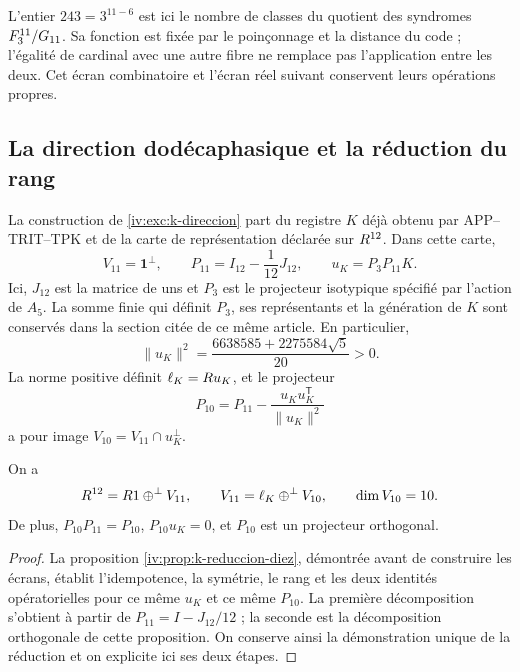 L’entier \(243=3^{11-6}\) est ici le nombre de classes
du quotient des syndromes \(F_3^{11}/G_{11}\). Sa
fonction est fixée par le poinçonnage et la distance du
code ; l’égalité de cardinal avec une autre fibre ne remplace pas
l’application entre les deux. Cet écran combinatoire et
l’écran réel suivant conservent leurs opérations propres.

\subsection{La direction dodécaphasique et la réduction du rang}

La construction de \ref{iv:exc:k-direccion} part du registre
\(K\) déjà obtenu par APP--TRIT--TPK et de la carte de
représentation déclarée sur \(R^{12}\). Dans cette carte,
\begin{equation}
 V_{11}=\mathbf1^\perp,\qquad
 P_{11}=I_{12}-\frac1{12}J_{12},\qquad
 u_K=P_3P_{11}K.
 \label{iv:iv:eq:p11-uk}
\end{equation}
Ici, \(J_{12}\) est la matrice de uns et \(P_3\) est le
projecteur isotypique spécifié par l’action de \(A_5\).
La somme finie qui définit \(P_3\), ses représentants et la
génération de \(K\) sont conservés dans la section citée de
ce même article. En particulier,
\[
 \|u_K\|^2=\frac{6638585+2275584\sqrt5}{20}>0.
\]
La norme positive définit \(\ell_K=R u_K\), et le
projecteur
\begin{equation}
 P_{10}=P_{11}-\frac{u_Ku_K^{\mathsf T}}{\|u_K\|^2}
 \label{iv:iv:eq:p10}
\end{equation}
a pour image \(V_{10}=V_{11}\cap u_K^\perp\).

\begin{proposition}
\label{iv:iv:prop:12-11-10}
On a
\[
 R^{12}=R1\mathbin{\oplus^\perp}V_{11},\qquad
 V_{11}=\ell_K\mathbin{\oplus^\perp}V_{10},\qquad
 \dim V_{10}=10.
\]
De plus, \(P_{10}P_{11}=P_{10}\), \(P_{10}u_K=0\), et
\(P_{10}\) est un projecteur orthogonal.
\end{proposition}
\begin{proof}
La proposition \ref{iv:prop:k-reduccion-diez}, démontrée avant de
construire les écrans, établit l’idempotence, la symétrie, le rang et
les deux identités opératorielles pour ce même \(u_K\) et ce même
\(P_{10}\). La première décomposition s’obtient à partir de
\(P_{11}=I-J_{12}/12\) ; la seconde est la décomposition orthogonale
de cette proposition. On conserve ainsi la démonstration unique de la
réduction et on explicite ici ses deux étapes.
\end{proof}


